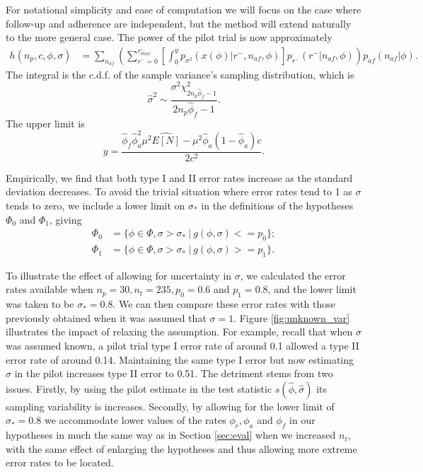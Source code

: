 \documentclass[AMA,STIX1COL]{WileyNJD-v2}
\begin{document}
For notational simplicity and ease of computation we will focus on the case where follow-up and adherence are independent, but the method will extend naturally to the more general case. The power of the pilot trial is now approximately 
\begin{align*}
h(n_p, c, \phi, \sigma) &= \sum_{n_{af}} \left( \sum_{r^- = 0}^{r^-_{max}} 
\left[ \int_0^y p_{\sigma^2}(x(\phi) | r^-, n_{af}, \phi) \right] p_{r^-}(r^- | n_{af}, \phi) \right)     
p_{af}(n_{af} |\phi).
\end{align*}
The integral is the c.d.f. of the sample variance's sampling distribution, which is
$$
\hat{\sigma}^2 \sim \frac{\sigma^2 \chi^2_{2n_p\hat{\phi}_f - 1}}{2n_p\hat{\phi}_f - 1}.
$$
The upper limit is
$$
y = \frac{\hat{\phi}_f \hat{\phi}_a^2 \mu^2 \hat{E[N]} - \mu^2 \hat{\phi}_a (1-\hat{\phi}_a) c}{2c^2}.
$$

Empirically, we find that both type I and II error rates increase as the standard deviation decreases. To avoid the trivial situation where error rates tend to 1 as $\sigma$ tends to zero, we include a lower limit on $\sigma_*$ in the definitions of the hypotheses $\Phi_0$ and $\Phi_1$, giving
\begin{align*}
\Phi_0 &= \{\phi \in \Phi, \sigma > \sigma_*  ~ | ~ g(\phi, \sigma) <= p_0 \}; \\
\Phi_1 &= \{\phi \in \Phi, \sigma > \sigma_* ~ | ~ g(\phi, \sigma) >= p_1 \}.
\end{align*}

To illustrate the effect of allowing for uncertainty in $\sigma$, we calculated the error rates available when $n_p = 30, n_t = 235, p_0 = 0.6$ and $p_1 = 0.8$, and the lower limit was taken to be $\sigma_* = 0.8$. We can then compare these error rates with those previously obtained when it was assumed that $\sigma = 1$. Figure \ref{fig:unknown_var} illustrates the impact of relaxing the assumption. For example, recall that when $\sigma$ was assumed known, a pilot trial type I error rate of around 0.1 allowed a type II error rate of around 0.14. Maintaining the same type I error but now estimating $\sigma$ in the pilot increases type II error to 0.51. The detriment stems from two issues. Firstly, by using the pilot estimate in the test statistic $s(\hat{\phi}, \hat{\sigma})$ its sampling variability is increases. Secondly, by allowing for the lower limit of $\sigma_* = 0.8$ we accommodate lower values of the rates $\phi_r, \phi_a$ and $\phi_f$ in our hypotheses in much the same way as in Section \ref{sec:eval} when we increased $n_t$, with the same effect of enlarging the hypotheses and thus allowing more extreme error rates to be located.
\end{document}
